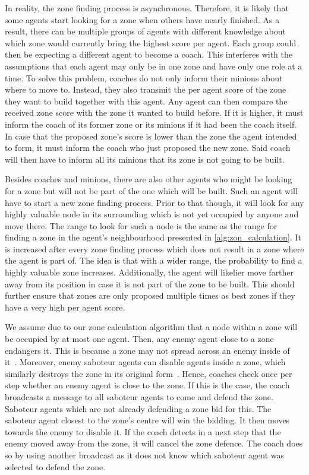 In reality, the zone finding process is asynchronous. Therefore, it is likely that some agents start looking for a zone when others have nearly finished. As a result, there can be multiple groups of agents with different knowledge about which zone would currently bring the highest score per agent. Each group could then be expecting a different agent to become a coach. This interferes with the assumptions that each agent may only be in one zone and have only one role at a time. To solve this problem, coaches do not only inform their minions about where to move to. Instead, they also transmit the per agent score of the zone they want to build together with this agent. Any agent can then compare the received zone score with the zone it wanted to build before. If it is higher, it must inform the coach of its former zone or its minions if it had been the coach itself. In case that the proposed zone's score is lower than the zone the agent intended to form, it must inform the coach who just proposed the new zone. Said coach will then have to inform all its minions that its zone is not going to be built.

Besides coaches and minions, there are also other agents who might be looking for a zone but will not be part of the one which will be built. Such an agent will have to start a new zone finding process. Prior to that though, it will look for any highly valuable node in its surrounding which is not yet occupied by anyone and move there. The range to look for such a node is the same as the range for finding a zone in the agent's neighbourhood presented in \autoref{alg:zon_calculation}. It is increased after every zone finding process which does not result in a zone where the agent is part of. The idea is that with a wider range, the probability to find a highly valuable zone increases. Additionally, the agent will likelier move farther away from its position in case it is not part of the zone to be built. This should further ensure that zones are only proposed multiple times as best zones if they have a very high per agent score.

We assume due to our zone calculation algorithm that a node within a zone will be occupied by at most one agent. %
Then, any enemy agent close to a zone endangers it. This is because a zone may not spread across an enemy inside of it~\cite{ahlbrecht_mapc_2014}. %
Moreover, enemy saboteur agents can disable agents inside a zone, which similarly destroys the zone in its original form~\cite{ahlbrecht_mapc_2014}. %
Hence, coaches check once per step whether an enemy agent is close to the zone. If this is the case, the coach broadcasts a message to all saboteur agents to come and defend the zone. Saboteur agents which are not already defending a zone bid for this. The saboteur agent closest to the zone's centre will win the bidding. It then moves towards the enemy to disable it. If the coach detects in a next step that the enemy moved away from the zone, it will cancel the zone defence. The coach does so by using another broadcast as it does not know which saboteur agent was selected to defend the zone.

